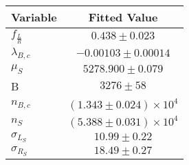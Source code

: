 \begin{tabular}[t]{lc}
\hline
Variable &Fitted Value\\
\hline\hline
$f_{\frac{L}{R}}$&$0.438\pm0.023$\\
\hline
$\lambda_{B,c}$&$-0.00103\pm0.00014$\\
\hline
$\mu_S$&$5278.900\pm0.079$\\
\hline
B&$3276\pm58$\\
\hline
$n_{B,c}$&$(1.343\pm0.024)\times 10^4$\\
\hline
$n_S$&$(5.388\pm0.031)\times 10^4$\\
\hline
$\sigma_{L_S}$&$10.99\pm0.22$\\
\hline
$\sigma_{R_S}$&$18.49\pm0.27$\\
\hline
\end{tabular}